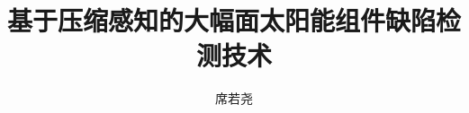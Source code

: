 \documentclass[WordOneHalf]{XDUthesis}
\title{基于压缩感知的大幅面太阳能组件缺陷检测技术}
\author{席若尧}
\begin{document}


\makeatletter
\XDU@setpdf@keywords
\makeatother

\maketitle


\renewcommand{\emph}[1]{\1\todo{Remove this bloody emph!}}











\appendix

\end{document}
